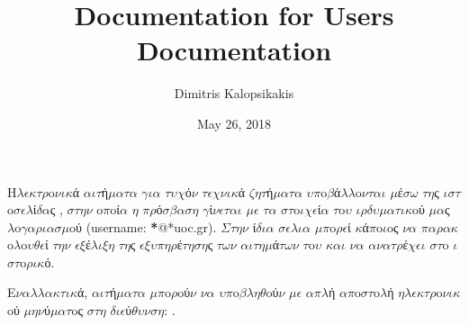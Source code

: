 \documentclass[a4paper,11pt,english]{sphinxmanual}
\title{Documentation for Users Documentation}
\date{May 26, 2018}
\author{Dimitris Kalopsikakis}
\begin{document}
\maketitle
\sphinxtableofcontents
{}\label{\detokenize{index::doc}}


H\(\lambda\)\(\epsilon\)\(\kappa\)\(\tau\)\(\rho\)o\(\nu\)\(\iota\)\(\kappa\)ά \(\alpha\)\(\iota\)\(\tau\)ή\(\mu\)\(\alpha\)\(\tau\)\(\alpha\) \(\gamma\)\(\iota\)\(\alpha\) \(\tau\)\(\upsilon\)\(\chi\)ό\(\nu\) \(\tau\)\(\epsilon\)\(\chi\)\(\nu\)\(\iota\)\(\kappa\)ά \(\zeta\)\(\eta\)\(\tau\)ή\(\mu\)\(\alpha\)\(\tau\)\(\alpha\) \(\upsilon\)\(\pi\)o\(\beta\)ά\(\lambda\)\(\lambda\)o\(\nu\)\(\tau\)\(\alpha\)\(\iota\)
\(\mu\)έ\(\sigma\)\(\omega\) \(\tau\)\(\eta\)ς \(\iota\)\(\sigma\)\(\tau\)o\(\sigma\)\(\epsilon\)\(\lambda\)ί\(\delta\)\(\alpha\)ς , \(\sigma\)\(\tau\)\(\eta\)\(\nu\) o\(\pi\)oί\(\alpha\)
\(\eta\) \(\pi\)\(\rho\)ό\(\sigma\)\(\beta\)\(\alpha\)\(\sigma\)\(\eta\) \(\gamma\)ί\(\nu\)\(\epsilon\)\(\tau\)\(\alpha\)\(\iota\) \(\mu\)\(\epsilon\) \(\tau\)\(\alpha\) \(\sigma\)\(\tau\)o\(\iota\)\(\chi\)\(\epsilon\)ί\(\alpha\) \(\tau\)o\(\upsilon\) \(\iota\)\(\rho\)\(\delta\)\(\upsilon\)\(\mu\)\(\alpha\)\(\tau\)\(\iota\)\(\kappa\)oύ \(\mu\)\(\alpha\)ς \(\lambda\)o\(\gamma\)\(\alpha\)\(\rho\)\(\iota\)\(\alpha\)\(\sigma\)\(\mu\)oύ
(username: {\color{red}\bfseries{}*}@*uoc.gr). \(\Sigma\)\(\tau\)\(\eta\)\(\nu\) ί\(\delta\)\(\iota\)\(\alpha\) \(\sigma\)\(\epsilon\)\(\lambda\)\(\iota\)\(\alpha\) \(\mu\)\(\pi\)o\(\rho\)\(\epsilon\)ί \(\kappa\)ά\(\pi\)o\(\iota\)oς
\(\nu\)\(\alpha\) \(\pi\)\(\alpha\)\(\rho\)\(\alpha\)\(\kappa\)o\(\lambda\)o\(\upsilon\)\(\theta\)\(\epsilon\)ί \(\tau\)\(\eta\)\(\nu\) \(\epsilon\)\(\xi\)έ\(\lambda\)\(\iota\)\(\xi\)\(\eta\) \(\tau\)\(\eta\)ς \(\epsilon\)\(\xi\)\(\upsilon\)\(\pi\)\(\eta\)\(\rho\)έ\(\tau\)\(\eta\)\(\sigma\)\(\eta\)ς \(\tau\)\(\omega\)\(\nu\) \(\alpha\)\(\iota\)\(\tau\)\(\eta\)\(\mu\)ά\(\tau\)\(\omega\)\(\nu\) \(\tau\)o\(\upsilon\)
\(\kappa\)\(\alpha\)\(\iota\) \(\nu\)\(\alpha\) \(\alpha\)\(\nu\)\(\alpha\)\(\tau\)\(\rho\)έ\(\chi\)\(\epsilon\)\(\iota\) \(\sigma\)\(\tau\)o \(\iota\)\(\sigma\)\(\tau\)o\(\rho\)\(\iota\)\(\kappa\)ό.

E\(\nu\)\(\alpha\)\(\lambda\)\(\lambda\)\(\alpha\)\(\kappa\)\(\tau\)\(\iota\)\(\kappa\)ά, \(\alpha\)\(\iota\)\(\tau\)ή\(\mu\)\(\alpha\)\(\tau\)\(\alpha\) \(\mu\)\(\pi\)o\(\rho\)oύ\(\nu\) \(\nu\)\(\alpha\) \(\upsilon\)\(\pi\)o\(\beta\)\(\lambda\)\(\eta\)\(\theta\)oύ\(\nu\) \(\mu\)\(\epsilon\) \(\alpha\)\(\pi\)\(\lambda\)ή \(\alpha\)\(\pi\)o\(\sigma\)\(\tau\)o\(\lambda\)ή \(\eta\)\(\lambda\)\(\epsilon\)\(\kappa\)\(\tau\)\(\rho\)o\(\nu\)\(\iota\)\(\kappa\)oύ
\(\mu\)\(\eta\)\(\nu\)ύ\(\mu\)\(\alpha\)\(\tau\)oς \(\sigma\)\(\tau\)\(\eta\) \(\delta\)\(\iota\)\(\epsilon\)ύ\(\theta\)\(\upsilon\)\(\nu\)\(\sigma\)\(\eta\): .
\end{document}
